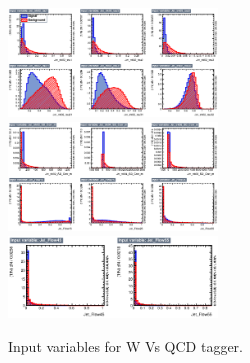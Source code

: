 \documentclass{cernrep}
\begin{document}
\begin{figure}[!htb]\centering
\includegraphics[width=0.495\textwidth]{Fig/TMVA/Whad_vs_QCD/variables_id_c1.eps}
\includegraphics[width=0.495\textwidth]{Fig/TMVA/Whad_vs_QCD/variables_id_c2.eps}
\includegraphics[width=0.495\textwidth]{Fig/TMVA/Whad_vs_QCD/variables_id_c3.eps}
\caption{Input variables for W Vs QCD tagger.}
\label{fig:TMVA_inputs_t}
\end{figure}
\end{document}
